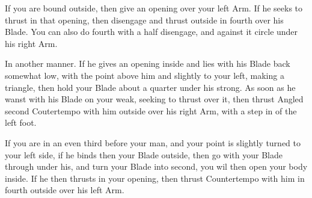 \exercise{}

If you are bound outside, then give an opening over your left Arm. If
he seeks to thrust in that opening, then disengage and thrust outside
in fourth over his Blade. You can also do fourth with a half
disengage, and against it circle under his right Arm.

\exercise{}

In another manner. If he gives an opening inside and lies with his
Blade back somewhat low, with the point above him and slightly to your
left, making a triangle, then hold your Blade about a quarter under
his strong. As soon as he wanst with his Blade on your weak, seeking
to thrust over it, then thrust Angled second Coutertempo with him
outside over his right Arm, with a step in of the left foot.

\exercise{}

If you are in an even third before your man, and your point is
slightly turned to your left side, if he binds then your Blade
outside, then go with your Blade through under his, and turn your
Blade into second, you wil then open your body inside. If he then
thrusts in your opening, then thrust Countertempo with him in fourth
outside over his left Arm.

\newpage


\newpage


\exercise{}

